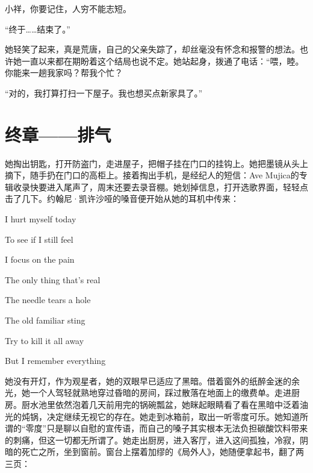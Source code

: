 \documentclass{article}
\begin{document}
小祥，你要记住，人穷不能志短。



“终于……结束了。”



她轻笑了起来，真是荒唐，自己的父亲失踪了，却丝毫没有怀念和报警的想法。也许她一直以来都在期盼着这个结局也说不定。她站起身，拨通了电话：“喂，睦。你能来一趟我家吗？帮我个忙？



“对的，我打算打扫一下屋子。我也想买点新家具了。”



\newpage





{\centering\section*{终章——排气}}





她掏出钥匙，打开防盗门，走进屋子，把帽子挂在门口的挂钩上。她把墨镜从头上摘下，随手扔在门口的高柜上。接着掏出手机，是经纪人的短信：Ave Mujica的专辑收录快要进入尾声了，周末还要去录音棚。她划掉信息，打开选歌界面，轻轻点击了几下。约翰尼·凯许沙哑的嗓音便开始从她的耳机中传来：



I hurt myself today

To see if I still feel

I focus on the pain

The only thing that's real

The needle tears a hole

The old familiar sting

Try to kill it all away

But I remember everything



她没有开灯，作为观星者，她的双眼早已适应了黑暗。借着窗外的纸醉金迷的余光，她一个人驾轻就熟地穿过昏暗的房间，踩过散落在地面上的缴费单。走进厨房。厨水池里依然泡着几天前用完的锅碗瓢盆，她眯起眼睛看了看在黑暗中泛着油光的炖锅，决定继续无视它的存在。她走到冰箱前，取出一听零度可乐。她知道所谓的“零度”只是聊以自慰的宣传语，而自己的嗓子其实根本无法负担碳酸饮料带来的刺痛，但这一切都无所谓了。她走出厨房，进入客厅，进入这间孤独，冷寂，阴暗的死亡之所，坐到窗前。窗台上摆着加缪的《局外人》，她随便拿起书，翻了两三页：
\end{document}
